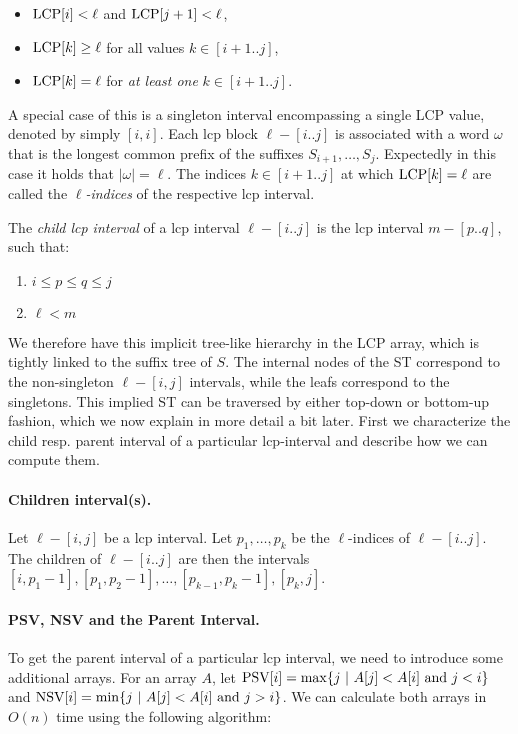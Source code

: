 \begin{itemize}
\tightlist
\item
  $\text{LCP}[i] < \ell$ and $\text{LCP}[j+1] < \ell$,
\item
  $\text{LCP}[k] \geq \ell$ for all values $k \in [i+1..j]$,
\item
  $\text{LCP}[k] = \ell$ for \emph{at least one} $k \in [i+1..j]$.
\end{itemize}

A special case of this is a singleton interval encompassing a single LCP value, denoted by simply $[i,i]$.
Each lcp block $\ell-[i..j]$ is associated with a word $\omega$ that is the longest common prefix of the suffixes $S_{i+1}, \ldots, S_j$.
Expectedly in this case it holds that $|\omega| = \ell$.
The indices $k \in [i+1..j]$ at which $\text{LCP}[k] = \ell$ are called the \emph{$\ell$-indices} of the respective lcp interval.

The \emph{child lcp interval} of a lcp interval $\ell-[i..j]$ is the lcp interval $m-[p..q]$, such that:
\begin{enumerate}
    \item $i \leq p \leq q \leq j$
    \item $\ell < m$ 
\end{enumerate}

We therefore have this implicit tree-like hierarchy in the LCP array, which is tightly linked to the suffix tree of $S$.
The internal nodes of the ST correspond to the non-singleton $\ell-[i,j]$ intervals, while the leafs correspond to the singletons.
This implied ST can be traversed by either top-down or bottom-up fashion, which we now explain in more detail a bit later.
First we characterize the child resp. parent interval of a particular lcp-interval and describe how we can compute them.

\paragraph{Children interval(s).}
\label{sec:lcpChildren}
Let $\ell-[i,j]$ be a lcp interval.
Let $p_1, \ldots, p_k$ be the $\ell$-indices of $\ell-[i..j]$.
The children of $\ell-[i..j]$ are then the intervals $[i, p_1-1], [p_1, p_2-1], \ldots, [p_{k-1}, p_k-1], [p_k, j]$.

\paragraph{PSV, NSV and the Parent Interval.}
To get the parent interval of a particular lcp interval, we need to introduce some additional arrays.
For an array $A$, let $\text{PSV}[i] = \max \{ j ~|~ A[j] < A[i] \text{ and } j < i \}$ and $\text{NSV}[i] = \min \{ j ~|~ A[j] < A[i] \text{ and } j > i \}$.
We can calculate both arrays in $O(n)$ time using the following algorithm:

